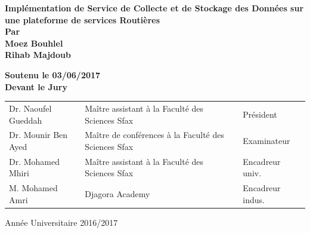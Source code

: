 \begin{titlepage}
    {\bfseries \Huge \color[RGB]{16,121,196}
        Implémentation de Service de Collecte et de Stockage des Données sur une plateforme de services Routières
    }\\[0.3in]

    {\bfseries \large Par} \\[0.25in]

    {\bfseries \LARGE \color[RGB]{255,90,90}
        Moez Bouhlel \\
        Rihab Majdoub
    }

    \vspace{0.4in}
    {\large \bfseries
        Soutenu le 03/06/2017 \\
        Devant le Jury
    }\\[0.3in]

    \normalsize
    \bfseries
    \setlength{\tabcolsep}{10pt}
    \begin{tabular}{l l l}
        Dr. Naoufel Gueddah & Maître assistant à la Faculté des Sciences Sfax & Président \\
        Dr. Mounir Ben Ayed & Maître de conférences à la Faculté des Sciences Sfax & Examinateur \\
        Dr. Mohamed Mhiri & Maître assistant à la Faculté des Sciences Sfax & Encadreur univ. \\
        M. Mohamed Amri & Djagora Academy & Encadreur indus.
    \end{tabular}

    \vfill
    Année Universitaire 2016/2017

\end{titlepage}
\restoregeometry
